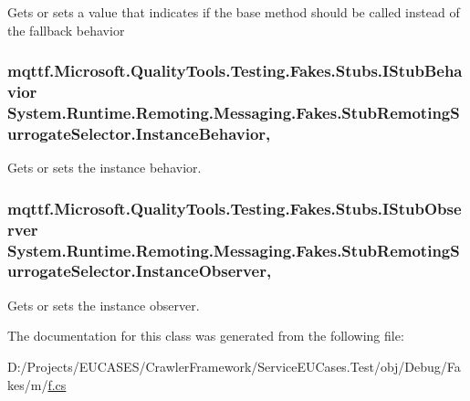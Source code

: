 Gets or sets a value that indicates if the base method should be called instead of the fallback behavior

\hypertarget{class_system_1_1_runtime_1_1_remoting_1_1_messaging_1_1_fakes_1_1_stub_remoting_surrogate_selector_ab32437565a16ba6e28787c1df7a73b32}{
\subsubsection[{Instance\-Behavior}]{\setlength{\rightskip}{0pt plus 5cm}mqttf.\-Microsoft.\-Quality\-Tools.\-Testing.\-Fakes.\-Stubs.\-I\-Stub\-Behavior System.\-Runtime.\-Remoting.\-Messaging.\-Fakes.\-Stub\-Remoting\-Surrogate\-Selector.\-Instance\-Behavior\hspace{0.3cm}{\ttfamily [get]}, {\ttfamily [set]}}}\label{class_system_1_1_runtime_1_1_remoting_1_1_messaging_1_1_fakes_1_1_stub_remoting_surrogate_selector_ab32437565a16ba6e28787c1df7a73b32}


Gets or sets the instance behavior.

\hypertarget{class_system_1_1_runtime_1_1_remoting_1_1_messaging_1_1_fakes_1_1_stub_remoting_surrogate_selector_a14db56db4528346b8fe7e03ad6c79b78}{
\subsubsection[{Instance\-Observer}]{\setlength{\rightskip}{0pt plus 5cm}mqttf.\-Microsoft.\-Quality\-Tools.\-Testing.\-Fakes.\-Stubs.\-I\-Stub\-Observer System.\-Runtime.\-Remoting.\-Messaging.\-Fakes.\-Stub\-Remoting\-Surrogate\-Selector.\-Instance\-Observer\hspace{0.3cm}{\ttfamily [get]}, {\ttfamily [set]}}}\label{class_system_1_1_runtime_1_1_remoting_1_1_messaging_1_1_fakes_1_1_stub_remoting_surrogate_selector_a14db56db4528346b8fe7e03ad6c79b78}


Gets or sets the instance observer.



The documentation for this class was generated from the following file\-:\begin{DoxyCompactItemize}
\item 
D\-:/\-Projects/\-E\-U\-C\-A\-S\-E\-S/\-Crawler\-Framework/\-Service\-E\-U\-Cases.\-Test/obj/\-Debug/\-Fakes/m/\hyperlink{m_2f_8cs}{f.\-cs}\end{DoxyCompactItemize}
